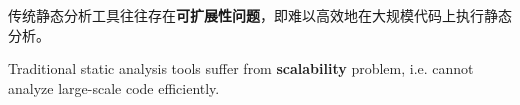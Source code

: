 
\begin{cabstract}
	传统静态分析工具往往存在\textbf{可扩展性问题}，即难以高效地在大规模代码上执行静态分析。

\end{cabstract}

\begin{eabstract}
	Traditional static analysis tools suffer from \textbf{scalability} problem, i.e. cannot analyze large-scale code efficiently.

\end{eabstract}
